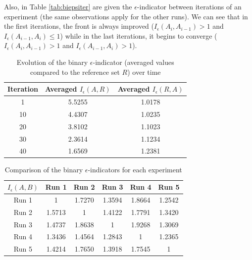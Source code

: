 Also, in Table \ref{tab:biepsiter} are given the $\epsilon$-indicator between iterations of an experiment (the same observations apply for the other runs). We can see that in the first iterations, the front is always improved ($I_\epsilon(A_i, A_{i-1}) > 1$ and $I_\epsilon(A_{i-1}, A_i) \leq 1$) while in the last iterations, it begins to converge ($I_\epsilon(A_i, A_{i-1}) > 1$ and $I_\epsilon(A_{i-1}, A_i) > 1$).

\begin{table}[h!]
\begin{center}
\begin{small}
\begin{tabular}{|c|c|c|}
\hline Iteration & Averaged $I_\epsilon(A,R)$ & Averaged $I_\epsilon(R,A)$\\
\hline 1 & 5.5255 & 1.0178\\
\hline 10 & 4.4307 & 1.0235\\
\hline 20 & 3.8102 & 1.1023\\
\hline 30 & 2.3614 & 1.1234\\
\hline 40 & 1.6569 & 1.2381\\
\hline
\end{tabular}
\end{small}
\end{center}
\caption{Evolution of the binary $\epsilon$-indicator (averaged values compared to the reference set $R$) over time}
\label{tab:biepsref}
\end{table}

\begin{table}[h!]
\begin{center}
\begin{footnotesize}
\begin{tabular}{|c|c|c|c|c|c|}
\hline $I_\epsilon(A,B)$ & Run 1 & Run 2 & Run 3 & Run 4 & Run 5 \\ 
\hline Run 1 & 1 & 1.7270 & 1.3594 & 1.8664 & 1.2542 \\ 
\hline Run 2 & 1.5713 & 1 & 1.4122 & 1.7791 & 1.3420 \\ 
\hline Run 3 & 1.4737 & 1.8638 & 1 & 1.9268 & 1.3069 \\ 
\hline Run 4 & 1.3436 & 1.4564 & 1.2843 & 1 & 1.2365 \\ 
\hline Run 5 & 1.4214 & 1.7650 & 1.3918 & 1.7545 & 1 \\ 
\hline 
\end{tabular} 
\end{footnotesize}
\end{center}
\caption{Comparison of the binary $\epsilon$-indicators for each experiment}
\label{tab:biepsxp}
\end{table}

